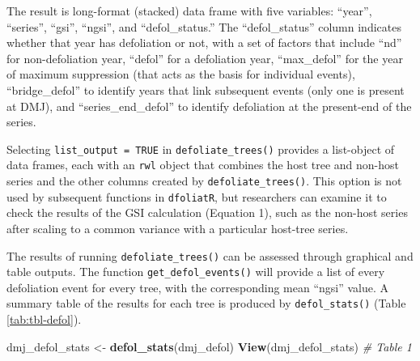 \documentclass[review]{elsarticle} %
\newenvironment{Shaded}{\begin{snugshade}}{\end{snugshade}}
\newcommand{\CommentTok}[1]{\textcolor[rgb]{0.56,0.35,0.01}{\textit{#1}}}
\newcommand{\KeywordTok}[1]{\textcolor[rgb]{0.13,0.29,0.53}{\textbf{#1}}}
\newcommand{\NormalTok}[1]{#1}
\newcommand{\StringTok}[1]{\textcolor[rgb]{0.31,0.60,0.02}{#1}}
\begin{document}
The result is long-format (stacked) data frame with five variables: ``year'', ``series'', ``gsi'', ``ngsi'', and ``defol\_status.'' The ``defol\_status'' column indicates whether that year has defoliation or not, with a set of factors that include ``nd'' for non-defoliation year, ``defol'' for a defoliation year, ``max\_defol'' for the year of maximum suppression (that acts as the basis for individual events), ``bridge\_defol'' to identify years that link subsequent events (only one is present at DMJ), and ``series\_end\_defol'' to identify defoliation at the present-end of the series.

Selecting \texttt{list\_output\ =\ TRUE} in \texttt{defoliate\_trees()} provides a list-object of data frames, each with an \texttt{rwl} object that combines the host tree and non-host series and the other columns created by \texttt{defoliate\_trees()}. This option is not used by subsequent functions in \texttt{dfoliatR}, but researchers can examine it to check the results of the GSI calculation (Equation 1), such as the non-host series after scaling to a common variance with a particular host-tree series.

The results of running \texttt{defoliate\_trees()} can be assessed through graphical and table outputs. The function \texttt{get\_defol\_events()} will provide a list of every defoliation event for every tree, with the corresponding mean ``ngsi'' value. A summary table of the results for each tree is produced by \texttt{defol\_stats()} (Table \ref{tab:tbl-defol}).

\begin{Shaded}
\begin{Highlighting}[]
\NormalTok{dmj_defol_stats <-}\StringTok{ }\KeywordTok{defol_stats}\NormalTok{(dmj_defol)}
\KeywordTok{View}\NormalTok{(dmj_defol_stats) }\CommentTok{# Table 1}
\end{Highlighting}
\end{Shaded}
\end{document}
